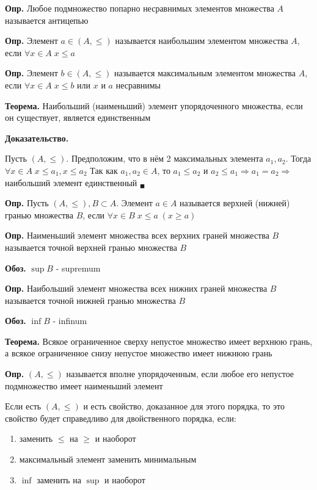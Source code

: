 \documentclass[10pt]{article}
\begin{document}
\par\textbf{Опр.} Любое подмножество попарно несравнимых элементов множества $A$ называется антицепью
\par\textbf{Опр.} Элемент $a \in (A, \leq)$ называется наибольшим элементом множества $A$, если $\forall x \in A \; x \leq a$
\par\textbf{Опр.} Элемент $b \in (A, \leq)$ называется максимальным элементом множества $A$, если $\forall x \in A \; x \leq b$ или $x$ и $a$ несравнимы
\par\textbf{Теорема.} Наибольший (наименьший) элемент упорядоченного множества, если он существует, является единственным
\par\textbf{Доказательство.}
\par Пусть $(A, \leq)$. Предположим, что в нём 2 максимальных элемента $a_{1}, a_{2}$. Тогда $\forall x \in A \; x \leq a_{1}, x \leq a_{2}$
Так как $a_{1}, a_{2} \in A$, то $a_{1} \leq a_{2}$ и $a_{2} \leq a_{1} \Rightarrow a_{1} = a_{2} \Rightarrow$ наибольший элемент единственный $_{\blacksquare}$
\par\textbf{Опр.} Пусть $(A, \leq), B \subset A$. Элемент $a \in A$ называется верхней (нижней) гранью множества $B$, если $\forall x \in B \; x \leq a \; (x \geq a)$
\par\textbf{Опр.} Наименьший элемент множества всех верхних граней множества $B$ называется точной верхней гранью множества $B$
\par\textbf{Обоз.} $\sup B$ - supremum
\par\textbf{Опр.} Наибольший элемент множества всех нижних граней множества $B$ называется точной нижней гранью множества $B$
\par\textbf{Обоз.} $\inf B$ - infinum

\par\textbf{Теорема.} Всякое ограниченное сверху непустое множество имеет верхнюю грань, а всякое ограниченное снизу непустое множество имеет нижнюю грань
\par\textbf{Опр.} $(A, \leq)$ называется вполне упорядоченным, если любое его непустое подмножество имеет наименьший элемент
\par Если есть $(A, \leq)$ и есть свойство, доказанное для этого порядка, то это свойство будет справедливо для двойственного порядка, если:
\begin{enumerate}
    \item заменить $\leq$ на $\geq$ и наоборот
    \item максимальный элемент заменить минимальным
    \item $\inf$ заменить на $\sup$ и наоборот
\end{enumerate}
\end{document}
